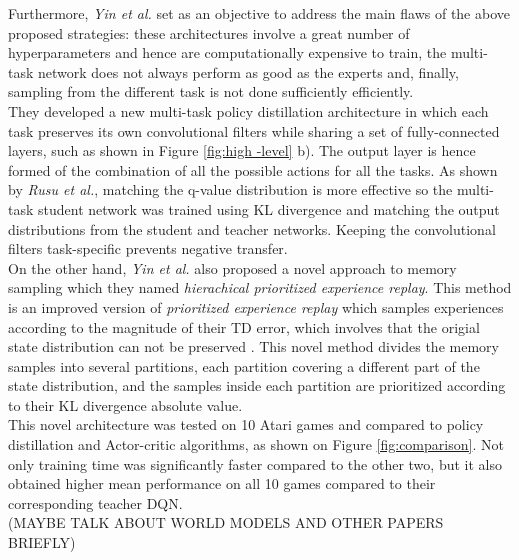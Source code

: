 \documentclass{article}
\begin{document}
Furthermore, \textit{Yin et al.} \citep{YinKnowledgeReplay} set as an objective to address the main flaws of the above proposed strategies: these architectures involve a great number of hyperparameters and hence are computationally expensive to train, the multi-task network does not always perform as good as the experts and, finally, sampling from the different task is not done sufficiently efficiently.\\
They developed a new multi-task policy distillation architecture in which each task preserves its own convolutional filters while sharing a set of fully-connected layers, such as shown in Figure \ref{fig:high -level} b). The output layer is hence formed of the combination of all the possible actions for all the tasks. As shown by \textit{Rusu et al.}, matching the q-value distribution is more effective so the multi-task student network was trained using KL divergence and matching the output distributions from the student and teacher networks. Keeping the convolutional filters task-specific prevents negative transfer.\\
On the other hand, \textit{Yin et al.} also proposed a novel approach to memory sampling which they named \textit{hierachical prioritized experience replay}. This method is an improved version of \textit{prioritized experience replay} \citep{Schaul2015PrioritizedReplay} which samples experiences according to the magnitude of their TD error, which involves that the origial state distribution can not be preserved \cite{YinKnowledgeReplay}. This novel method divides the memory samples into several partitions, each partition covering a different part of the state distribution, and the samples inside each partition are prioritized according to their KL divergence absolute value.\\
This novel architecture was tested on 10 Atari games and compared to policy distillation and Actor-critic algorithms, as shown on Figure \ref{fig:comparison}. Not only training time was significantly faster compared to the other two, but it also obtained higher mean performance on all 10 games compared to their corresponding teacher DQN.\\

(MAYBE TALK ABOUT WORLD MODELS AND OTHER PAPERS BRIEFLY)\\
\end{document}
